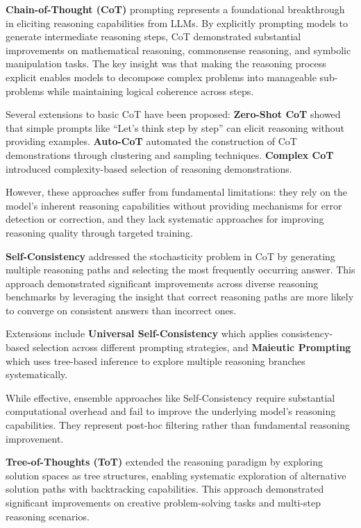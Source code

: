 \documentclass[10pt,twocolumn]{article}
\begin{document}
\textbf{Chain-of-Thought (CoT)} prompting represents a foundational breakthrough in eliciting reasoning capabilities from LLMs. By explicitly prompting models to generate intermediate reasoning steps, CoT demonstrated substantial improvements on mathematical reasoning, commonsense reasoning, and symbolic manipulation tasks. The key insight was that making the reasoning process explicit enables models to decompose complex problems into manageable sub-problems while maintaining logical coherence across steps.

Several extensions to basic CoT have been proposed: \textbf{Zero-Shot CoT} showed that simple prompts like ``Let's think step by step'' can elicit reasoning without providing examples. \textbf{Auto-CoT} automated the construction of CoT demonstrations through clustering and sampling techniques. \textbf{Complex CoT} introduced complexity-based selection of reasoning demonstrations.

However, these approaches suffer from fundamental limitations: they rely on the model's inherent reasoning capabilities without providing mechanisms for error detection or correction, and they lack systematic approaches for improving reasoning quality through targeted training.

\textbf{Self-Consistency} addressed the stochasticity problem in CoT by generating multiple reasoning paths and selecting the most frequently occurring answer. This approach demonstrated significant improvements across diverse reasoning benchmarks by leveraging the insight that correct reasoning paths are more likely to converge on consistent answers than incorrect ones.

Extensions include \textbf{Universal Self-Consistency} which applies consistency-based selection across different prompting strategies, and \textbf{Maieutic Prompting} which uses tree-based inference to explore multiple reasoning branches systematically.

While effective, ensemble approaches like Self-Consistency require substantial computational overhead and fail to improve the underlying model's reasoning capabilities. They represent post-hoc filtering rather than fundamental reasoning improvement.

\textbf{Tree-of-Thoughts (ToT)} extended the reasoning paradigm by exploring solution spaces as tree structures, enabling systematic exploration of alternative solution paths with backtracking capabilities. This approach demonstrated significant improvements on creative problem-solving tasks and multi-step reasoning scenarios.
\end{document}

